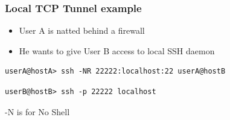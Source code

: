 \begin{frame}[fragile]
\frametitle{Local TCP Tunnel example}
\begin{itemize}
\item User A is natted behind a firewall
\item He wants to give User B access to local SSH daemon
\end{itemize}
\begin{lstlisting}
userA@hostA> ssh -NR 22222:localhost:22 userA@hostB
\end{lstlisting}
\begin{lstlisting}
userB@hostB> ssh -p 22222 localhost
\end{lstlisting}
\begin{center}-N is for No Shell\end{center}
\end{frame}


